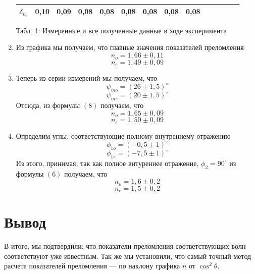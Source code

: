 \documentclass[a4paper, 12pt]{article}%
\begin{document}
\begin{enumerate}
\begin{center}
\begin{tabular}{|c|c|c|c|c|c|c|c|c|c|c|c|c|c|}
$\delta_{n_e}$                 & 0,10   & 0,09   & 0,08  & 0,08  & 0,08  & 0,08  & 0,08  & 0,08  \\ \hline
\end{tabular}
\end{center}
\begin{center}
\caption{Табл. 1: Измеренные и все полученные данные в ходе эксперимента}
\end{center}
\newpage
\item Из графика мы получаем, что главные значения показателей преломления 
\[n_o = 1,66 \pm 0,11\]
\[n_e = 1,49 \pm 0,09\]
\item Теперь из серии измерений мы получаем, что 
\[\psi_{mo} = (26 \pm 1,5) ^ {\circ}\]
\[\psi_{me} = (20 \pm 1,5) ^ {\circ}\]
Отсюда, из формулы $(8)$ получаем, что 
\[n_o = 1,65 \pm 0,09\]
\[n_e = 1,50 \pm 0,09\]
\item Определим углы, соответствующие полному внутреннему отражению
\[\phi_{1o} = (-0,5 \pm 1) ^{\circ}\]
\[\phi_{1e} = (-7,5 \pm 1) ^{\circ}\]
Из этого, принимая, так как полное внтуреннее отражение, $\phi_2 = 90^{\circ}$ из формулы $(6)$ получаем, что 
\[n_o = 1,6 \pm 0,2\]
\[n_e = 1,5 \pm 0,2\]
\end{enumerate}
\section*{Вывод}
В итоге, мы подтвердили, что показатели преломления соответствующих волн соответствуют уже известным. Так же мы установили, что самый точный метод расчета показателей преломления --- по наклону графика $n$ от $\cos^2\theta$.
\end{document}
